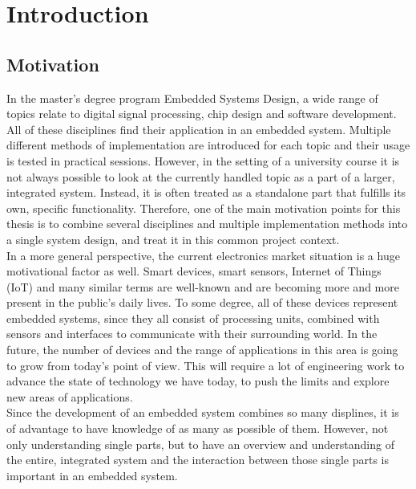 \chapter{Introduction}
\label{cha:Introduction}

\section{Motivation}

In the master's degree program Embedded Systems Design, a wide range of topics relate to digital signal processing, chip design and software development.
All of these disciplines find their application in an embedded system.
Multiple different methods of implementation are introduced for each topic and their usage is tested in practical sessions.
However, in the setting of a university course it is not always possible to look at the currently handled topic as a part of a larger, integrated system.
Instead, it is often treated as a standalone part that fulfills its own, specific functionality.
Therefore, one of the main motivation points for this thesis is to combine several disciplines and multiple implementation methods into a single system design, and treat it in this common project context.\\

In a more general perspective, the current electronics market situation is a huge motivational factor as well.
Smart devices, smart sensors, Internet of Things (IoT) and many similar terms are well-known and are becoming more and more present in the public's daily lives.
To some degree, all of these devices represent embedded systems, since they all consist of processing units, combined with sensors and interfaces to communicate with their surrounding world.
In the future, the number of devices and the range of applications in this area is going to grow from today's point of view.
This will require a lot of engineering work to advance the state of technology we have today, to push the limits and explore new areas of applications.\\

Since the development of an embedded system combines so many displines, it is of advantage to have knowledge of as many as possible of them.
However, not only understanding single parts, but to have an overview and understanding of the entire, integrated system and the interaction between those single parts is important in an embedded system.\\

